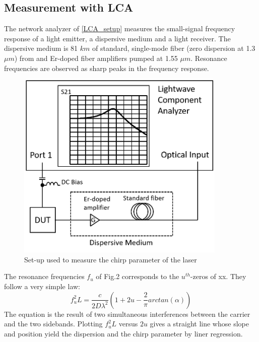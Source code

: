 \subsection{Measurement with LCA}
The network analyzer of \autoref{LCA_setup} measures the small-signal frequency response of a light emitter, a dispersive medium and a light receiver. The dispersive medium is 81 $km$ of standard, single-mode fiber (zero dispersion at 1.3 $\mu m$) from and Er-doped fiber amplifiers pumped at 1.55 $\mu m$. Resonance frequencies are observed as sharp peaks in the frequency response.
\begin{figure}[ht]
    \centering
    \includegraphics[width=10cm]{figures/LCA_setup.png}
    \caption{Set-up used to measure the chirp parameter of the laser}
    \label{LCA_setup}
\end{figure}
The resonance frequencies $f_u$ of Fig.2 corresponds to the $u^{th}$-zeros of xx. They follow a very simple law:
\begin{equation}
    f_u^2L=\frac{c}{2D\lambda ^2}(1+2u-\frac{2}{\pi}arctan(\alpha))
    \label{LCA_equa}
\end{equation}
The equation is the result of two simultaneous interferences between the carrier and the two sidebands. Plotting $f_u^2L$ versus $2u$ gives a straight line whose slope and position yield the dispersion and the chirp parameter by liner regression.


